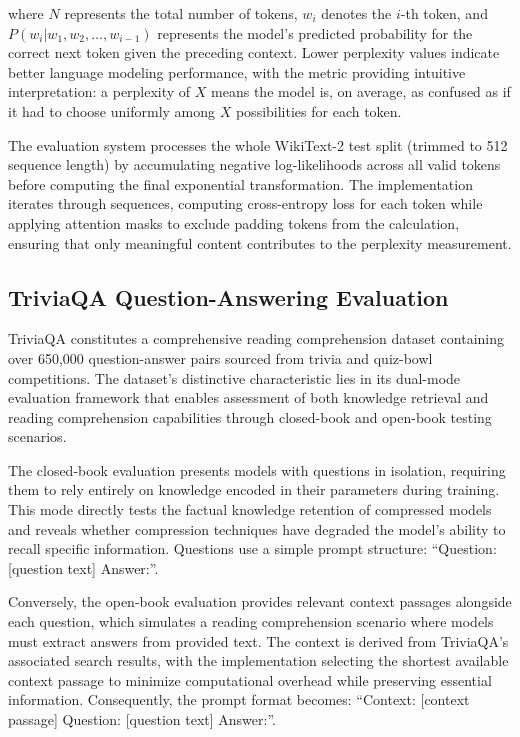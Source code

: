 where $N$ represents the total number of tokens, $w_i$ denotes the $i$-th token, and $P(w_i | w_1, w_2, \ldots, w_{i-1})$ represents the model's predicted probability for the correct next token given the preceding context.
Lower perplexity values indicate better language modeling performance, with the metric providing intuitive interpretation: a perplexity of $X$ means the model is, on average, as confused as if it had to choose uniformly among $X$ possibilities for each token.

The evaluation system processes the whole WikiText-2 test split (trimmed to 512 sequence length) by accumulating negative log-likelihoods across all valid tokens before computing the final exponential transformation. The implementation iterates through sequences, computing cross-entropy loss for each token while applying attention masks to exclude padding tokens from the calculation, ensuring that only meaningful content contributes to the perplexity measurement.

\subsection{TriviaQA Question-Answering Evaluation}

TriviaQA \cite{triviaqa} constitutes a comprehensive reading comprehension dataset containing over 650,000 question-answer pairs sourced from trivia and quiz-bowl competitions. The dataset's distinctive characteristic lies in its dual-mode evaluation framework that enables assessment of both knowledge retrieval and reading comprehension capabilities through closed-book and open-book testing scenarios.

The closed-book evaluation presents models with questions in isolation, requiring them to rely entirely on knowledge encoded in their parameters during training. This mode directly tests the factual knowledge retention of compressed models and reveals whether compression techniques have degraded the model's ability to recall specific information. Questions use a simple prompt structure: ``Question: [question text] Answer:''.

Conversely, the open-book evaluation provides relevant context passages alongside each question, which simulates a reading comprehension scenario where models must extract answers from provided text. The context is derived from TriviaQA's associated search results, with the implementation selecting the shortest available context passage to minimize computational overhead while preserving essential information. Consequently, the prompt format becomes: ``Context: [context passage] Question: [question text] Answer:''.

